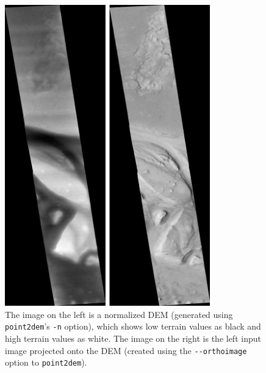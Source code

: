 \begin{figure}
\hfill
\begin{minipage}{3.5in}
\includegraphics[width=3.5in]{images/p19-norm_ortho.png}
\end{minipage}
\hfill
\begin{minipage}{2in}
\caption[P19 Normalized DEM and Orthophoto]{
    \label{p19-norm_ortho}
	The image on the left is a normalized DEM (generated using
        \texttt{point2dem}'s
        \texttt{-n} option), which shows low terrain values as black
        and high terrain values as white.  The image on the right is
        the left input image projected onto the DEM (created using the
        \texttt{-\/-orthoimage} option to \texttt{point2dem}).  }
\end{minipage}
\hfill
\end{figure}

%


